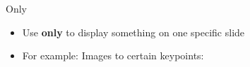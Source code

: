 \documentclass{beamer}
\begin{document}
\begin{frame}[t]
    \begin{columns}[t]
        \begin{block}{Only}
            \begin{itemize}
                \item Use \textbf{only} to display something on one specific slide
                \item For example: Images to certain keypoints:
                \begin{itemize}
                \end{itemize}
            \end{itemize}
        \end{block}
\end{columns}
\end{frame}
\end{document}
